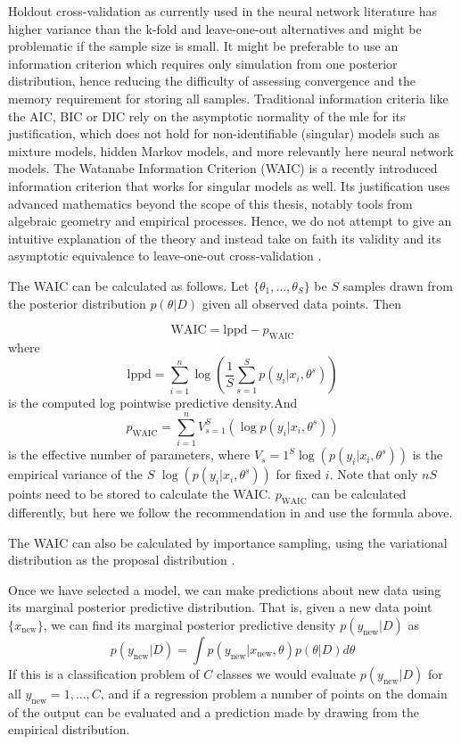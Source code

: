 \documentclass[12pt]{report}
\begin{document}
Holdout cross-validation as currently used in the neural network literature
has higher variance than the k-fold and leave-one-out alternatives and might be
problematic if the sample size is small. It might be
preferable to use an information criterion which requires only simulation from
one posterior distribution, hence reducing the difficulty of assessing convergence and the memory requirement for storing all samples. Traditional information criteria like the
AIC, BIC or DIC rely on the asymptotic normality of the mle for its
justification, which does not hold for non-identifiable (singular) models such
as mixture models, hidden Markov models, and more relevantly here neural network
models. The Watanabe Information Criterion (WAIC) is a recently introduced information criterion that works for
singular models as well. Its justification uses advanced mathematics beyond the
scope of this thesis, notably tools from algebraic geometry and empirical
processes. Hence, we do not attempt to give an intuitive explanation of the
theory and instead take on faith its validity and its asymptotic equivalence to
leave-one-out cross-validation \cite{watanabe2010asymptotic}.

The WAIC can be calculated as follows. Let $\{\theta_1, \dots, \theta_S\}$ be $S$ samples drawn from the posterior distribution $p(\theta|D)$ given all observed data points. Then 

\[\text{WAIC} = \text{lppd} - p_{\text{WAIC}} \]
where 
\[\text{lppd} = \sum_{i=1}^n \log( \frac{1}{S} \sum_{s=1}^S p(y_i|x_i,\theta^s) ) \]
is the computed log pointwise predictive density.And 
\[p_{\text{WAIC}} = \sum_{i=1}^n V_{s=1}^S(\log p(y_i|x_i, \theta^s)) \]
is the effective number of parameters, where $V_s=1^S \log(p(y_i|x_i,\theta^s))$ is the empirical variance of the $S$  $\log(p(y_i|x_i,\theta^s))$ for fixed $i$. Note that only $nS$ points need to be stored to calculate the WAIC. $p_{\text{WAIC}}$ can be calculated differently, but here we follow the recommendation in \cite{gelman2014bayesian} and use the formula above.

The WAIC can also be calculated by importance sampling, using the variational distribution as the proposal distribution \cite{yamada2012information}.

Once we have selected a model, we can make predictions about new data using its marginal posterior predictive distribution. That is, given a new data point $\{x_{\text{new}}\}$, we can find its marginal posterior predictive density $p(y_{\text{new}}|D)$ as 
\[ p(y_{\text{new}}|D) = \int p(y_{\text{new}}|x_{\text{new}},\theta) p(\theta|D) d\theta \]
If this is a classification problem of $C$ classes we would evaluate $p(y_{\text{new}}|D)$ for all $y_{\text{new}}=1,\dots, C$, and if a regression problem a number of points on the domain of the output can be evaluated 
and a prediction made by drawing from the empirical distribution. 
\end{document}
